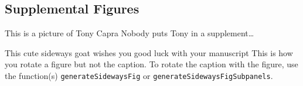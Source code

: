 \subsection*{Supplemental Figures}
\setcounter{figure}{0} %
\renewcommand{\thefigure}{S\arabic{figure}} %



    {This is a picture of Tony Capra}
    {Nobody puts Tony in a supplement\dots}
\tony


    {This cute sideways goat wishes you good luck with your manuscript} %
    {This is how you rotate a figure but not the caption. To rotate the caption with the figure, use the function(s) \texttt{generateSidewaysFig} or \texttt{generateSidewaysFigSubpanels}.} %
\cutegoat

\clearpage